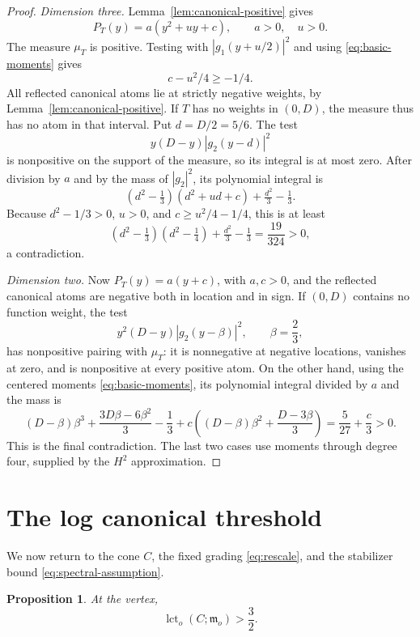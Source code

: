 \documentclass[11pt]{article}
\newtheorem{proposition}[theorem]{Proposition}
\theoremstyle{definition}
\theoremstyle{remark}
\numberwithin{equation}{section}
\newcommand{\m}{\mathfrak m}
\newcommand{\lct}{\operatorname{lct}}
\begin{document}
\begin{proof}
\emph{Dimension three.}
Lemma~\ref{lem:canonical-positive} gives
\[
P_T(y)=a(y^2+uy+c),\qquad a>0,\quad u>0.
\]
The measure \(\mu_T\) is positive. Testing with \(|g_1(y+u/2)|^2\) and using \eqref{eq:basic-moments} gives
\[
c-u^2/4\ge-1/4.
\]
All reflected canonical atoms lie at strictly negative weights, by Lemma~\ref{lem:canonical-positive}. If \(T\) has no weights in \((0,D)\), the measure thus has no atom in that interval. Put \(d=D/2=5/6\). The test
\[
y(D-y)|g_2(y-d)|^2
\]
is nonpositive on the support of the measure, so its integral is at most zero. After division by \(a\) and by the mass of \(|g_2|^2\), its polynomial integral is
\[
(d^2-\tfrac13)(d^2+ud+c)+\tfrac{d^2}{3}-\tfrac13.
\]
Because \(d^2-1/3>0\), \(u>0\), and \(c\ge u^2/4-1/4\), this is at least
\[
(d^2-\tfrac13)(d^2-\tfrac14)+\tfrac{d^2}{3}-\tfrac13
=\frac{19}{324}>0,
\]
a contradiction.

\emph{Dimension two.}
Now \(P_T(y)=a(y+c)\), with \(a,c>0\), and the reflected canonical atoms are negative both in location and in sign. If \((0,D)\) contains no function weight, the test
\[
y^2(D-y)|g_2(y-\beta)|^2,\qquad \beta=\frac23,
\]
has nonpositive pairing with \(\mu_T\): it is nonnegative at negative locations, vanishes at zero, and is nonpositive at every positive atom. On the other hand, using the centered moments \eqref{eq:basic-moments}, its polynomial integral divided by \(a\) and the mass is
\[
(D-\beta)\beta^3+\frac{3D\beta-6\beta^2}{3}-\frac13
+c\left((D-\beta)\beta^2+\frac{D-3\beta}{3}\right)
=\frac5{27}+\frac c3>0.
\]
This is the final contradiction. The last two cases use moments through degree four, supplied by the \(H^2\) approximation.
\end{proof}

\section{The log canonical threshold}\label{sec:threshold}

We now return to the cone \(C\), the fixed grading \eqref{eq:rescale}, and the stabilizer bound \eqref{eq:spectral-assumption}.

\begin{proposition}\label{prop:threshold}
At the vertex,
\[
\lct_o(C;\m_o)>\frac32.
\]
\end{proposition}
\end{document}

